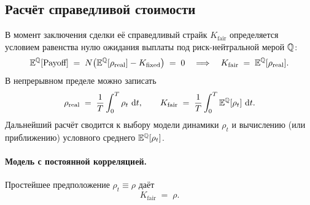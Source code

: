 \subsection{Расчёт справедливой стоимости}
\label{sec:corr-models}

В момент заключения сделки её справедливый страйк $K_{\text{fair}}$
определяется условием равенства нулю ожидания выплаты под риск-нейтральной
мерой $\mathbb{Q}$:
\begin{equation}
\label{eq:fair-strike}
  \mathbb{E}^{\mathbb{Q}}[\text{Payoff}] \;=\; N\bigl(\mathbb{E}^{\mathbb{Q}}[\rho_{\text{real}}]
                                   - K_{\text{fixed}}\bigr)\;=\;0
  \quad\Longrightarrow\quad
  K_{\text{fair}} \;=\; \mathbb{E}^{\mathbb{Q}}[\rho_{\text{real}}].
\end{equation}
В непрерывном пределе можно записать
\begin{equation}
\label{eq:rho-real-integral}
  \rho_{\text{real}} \;=\; \frac{1}{T}\int_0^T \rho_t\,\,\mathrm{d} t,
  \qquad
  K_{\text{fair}} \;=\; \frac{1}{T}\int_0^T \mathbb{E}^{\mathbb{Q}}[\rho_t]\,\,\mathrm{d} t.
\end{equation}
Дальнейший расчёт сводится к выбору модели динамики $\rho_t$ и
вычислению (или приближению) условного среднего $\mathbb{E}^{\mathbb{Q}}[\rho_t]$.

\paragraph{Модель с постоянной корреляцией.}
Простейшее предположение $\rho_t \equiv \rho$ даёт
\begin{equation}
\label{eq:fair-const}
  K_{\text{fair}} \;=\; \rho.
\end{equation}


